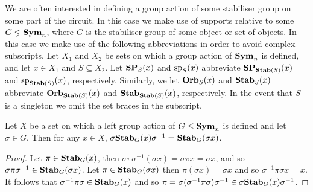 \documentclass[../paper.tex]{subfiles}
\begin{document}
We are often interested in defining a group action of some stabiliser group on
some part of the circuit. In this case we make use of supports relative to some
$G \lneq \text{\textbf{Sym}}_n$, where $G$ is the stabiliser group of some object or set of
objects. In this case we make use of the following abbreviations in order to
avoid complex subscripts. Let $X_1$ and $X_2$ be sets on which a group action of
$\text{\textbf{Sym}}_n$ is defined, and let $x \in X_1$ and $S \subseteq X_2$. Let $\text{\textbf{SP}}_S(x)$
and $\text{sp}_S(x)$ abbreviate $\text{\textbf{SP}}_{\text{\textbf{Stab}}(S)}(x)$ and $\text{sp}_{\text{\textbf{Stab}}(S)}(x)$,
respectively. Similarly, we let $\text{\textbf{Orb}}_S(x)$ and $\text{\textbf{Stab}}_S(x)$ abbreviate
$\text{\textbf{Orb}}_{\text{\textbf{Stab}}(S)}(x)$ and $\text{\textbf{Stab}}_{\text{\textbf{Stab}}(S)}(x)$, respectively. In the event that
$S$ is a singleton we omit the set braces in the subscript.




\begin{lem}
  \label{lem:stab-conjugation}
  Let $X$ be a set on which a left group action of $G \leq \text{\textbf{Sym}}_n$ is defined
  and let $\sigma \in G$. Then for any $x \in X$, $\sigma \text{\textbf{Stab}}_G (x)
  \sigma^{-1} = \text{\textbf{Stab}}_G(\sigma x)$.
\end{lem}

\begin{proof}
  Let $\pi \in \text{\textbf{Stab}}_G(x)$, then $\sigma \pi \sigma^{-1}(\sigma x) = \sigma \pi
  x = \sigma x$, and so $\sigma \pi \sigma^{-1} \in \text{\textbf{Stab}}_G(\sigma x)$. Let $\pi
  \in \text{\textbf{Stab}}_G(\sigma x)$ then $\pi (\sigma x) = \sigma x$ and so $\sigma^{-1}
  \pi \sigma x = x$. It follows that $\sigma^{-1} \pi \sigma \in \text{\textbf{Stab}}_G(x)$ and
  so $\pi = \sigma (\sigma^{-1} \pi \sigma) \sigma ^{-1} \in \sigma \text{\textbf{Stab}}_G(x)
  \sigma^{-1}$.
\end{proof}
\end{document}

